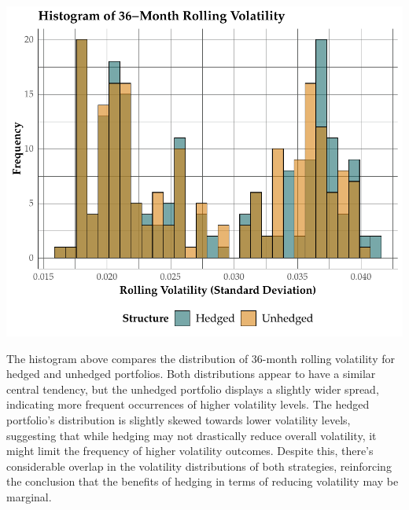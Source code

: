 \documentclass[11pt,preprint, authoryear]{elsarticle}
\numberwithin{equation}{section}
\numberwithin{figure}{section}
\numberwithin{table}{section}
\begin{document}
\includegraphics{Question-2_files/figure-latex/histogram-1.pdf}

The histogram above compares the distribution of 36-month rolling
volatility for hedged and unhedged portfolios. Both distributions appear
to have a similar central tendency, but the unhedged portfolio displays
a slightly wider spread, indicating more frequent occurrences of higher
volatility levels. The hedged portfolio's distribution is slightly
skewed towards lower volatility levels, suggesting that while hedging
may not drastically reduce overall volatility, it might limit the
frequency of higher volatility outcomes. Despite this, there's
considerable overlap in the volatility distributions of both strategies,
reinforcing the conclusion that the benefits of hedging in terms of
reducing volatility may be marginal.
\end{document}
